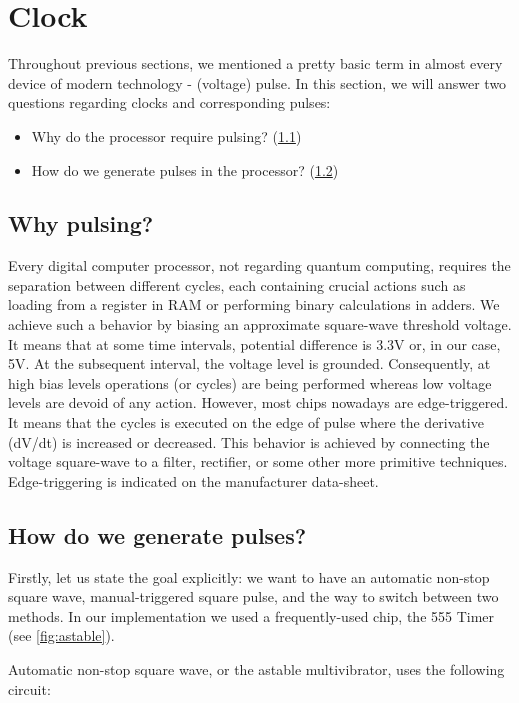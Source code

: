 \section{Clock} \label{sec:clock}
Throughout previous sections, we mentioned a pretty basic term in almost every device of modern technology - (voltage) pulse. In this section, we will answer two questions regarding clocks and corresponding pulses: 

\begin{itemize}
	\item Why do the processor require pulsing? (\ref{sec:clock:why_pulsing})
	\item How do we generate pulses in the processor? (\ref{sec:clock:how})
\end{itemize}

\subsection{Why pulsing?} \label{sec:clock:why_pulsing}
Every digital computer processor, not regarding quantum computing, requires the separation between different cycles, each containing crucial actions such as loading from a register in RAM or performing binary calculations in adders. We achieve such a behavior by biasing an approximate square-wave threshold voltage. It means that at some time intervals, potential difference is 3.3V or, in our case, 5V. At the subsequent interval, the voltage level is grounded. Consequently, at high bias levels operations (or cycles) are being performed whereas low voltage levels are devoid of any action. 
However, most chips nowadays are edge-triggered. It means that the cycles is executed on the edge of pulse where the derivative (dV/dt) is increased or decreased. This behavior is achieved by connecting the voltage square-wave to a filter, rectifier, or some other more primitive techniques. Edge-triggering is indicated on the manufacturer data-sheet.

\subsection{How do we generate pulses?} \label{sec:clock:how}
Firstly, let us state the goal explicitly: we want to have an automatic non-stop square wave, manual-triggered square pulse, and the way to switch between two methods. In our implementation we used a frequently-used chip, the 555 Timer (see \ref{fig:astable}).

Automatic non-stop square wave, or the astable multivibrator, uses the following circuit: 

